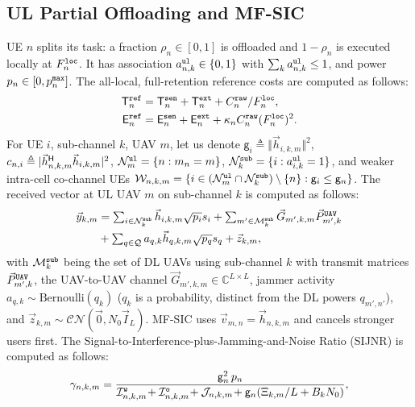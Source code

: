 \documentclass[journal]{IEEEtran}
\begin{document}
\subsection{UL Partial Offloading and MF-SIC}
\label{sec:ul}
UE $n$ splits its task: a fraction $\rho_n\in[0,1]$ is offloaded and $1-\rho_n$ is executed locally at $F_n^{\tt loc}$. It has association $a_{n,k}^{\tt ul}\in\{0,1\}$ with $\sum_k a_{n,k}^{\tt ul}\le 1$, and power $p_n\in[0,p_n^{\tt max}]$. The all-local, full-retention reference costs are computed as follows:
\begin{align}
\mathsf{T}_n^{\tt ref}&=\mathsf{T}_n^{\tt sen}+\mathsf{T}_n^{\tt ext}+C_n^{\tt raw}/F_n^{\tt loc},\label{eq:ref}\\
\mathsf{E}_n^{\tt ref}&=\mathsf{E}_n^{\tt sen}+\mathsf{E}_n^{\tt ext}+\kappa_n C_n^{\tt raw}(F_n^{\tt loc})^2 .\nonumber
\end{align}
For UE $i$, sub-channel $k$, UAV $m$, let us denote $\mathsf{g}_i\triangleq\Vert\vec{h}_{i,k,m}\Vert^2$, $c_{n,i}\triangleq|\vec{h}_{n,k,m}^{\sf H}\vec{h}_{i,k,m}|^2$, 
$\mathcal{N}_m^{\tt ul}=\{n:m_n=m\}$,
$\mathcal{N}_k^{\tt sub}=\{i:a_{i,k}^{\tt ul}=1\}$, and weaker intra-cell co-channel UEs $\mathcal{W}_{n,k,m}=\{i\in(\mathcal{N}_m^{\tt ul}\cap\mathcal{N}_k^{\tt sub})\setminus\{n\}:\mathsf{g}_i\le\mathsf{g}_n\}$.
The received vector at UL UAV $m$ on sub-channel $k$ is computed as follows:
\begin{equation}
\begin{aligned}
\textstyle\vec{y}_{k,m}&=\textstyle\sum_{i\in\mathcal{N}_k^{\tt sub}}\vec{h}_{i,k,m}\sqrt{p_i}s_i+\sum_{m'\in\mathcal{M}_k^{\tt sub}}\vec{G}_{m',k,m}\vec{P}_{m',k}^{\tt UAV}\\
&\textstyle+\sum_{q\in\mathcal{Q}}a_{q,k}\vec{h}_{q,k,m}\sqrt{p_q}s_q+\vec{z}_{k,m},
\end{aligned}
\label{eq:ul_y}
\end{equation}
with $\mathcal{M}_k^{\tt sub}$ being the set of DL UAVs using sub-channel $k$ with transmit matrices $\vec{P}_{m',k}^{\tt UAV}$, the UAV-to-UAV channel $\vec{G}_{m',k,m}\in\mathbb{C}^{L\times L}$, jammer activity $a_{q,k}\sim\mathrm{Bernoulli}(q_k)$ ($q_k$ is a probability, distinct from the DL powers $q_{m',n'}$), and $\vec{z}_{k,m}\sim\mathcal{CN}(\vec{0},N_0\vec{I}_L)$. MF-SIC uses $\vec{v}_{m,n}=\vec{h}_{n,k,m}$ and cancels stronger users first. The Signal-to-Interference-plus-Jamming-and-Noise Ratio (SIJNR) is computed as follows:
\begin{equation}
\gamma_{n,k,m}
=\frac{\mathsf{g}_n^2\, p_n}
{\mathcal{I}_{n,k,m}^{\tt w}\!+\mathcal{I}_{n,k,m}^{\tt o}\!+\mathcal{J}_{n,k,m}
\!+\mathsf{g}_n(\Xi_{k,m}/L+B_kN_0)},
\label{eq:ul_sijnr}
\end{equation}
\end{document}
